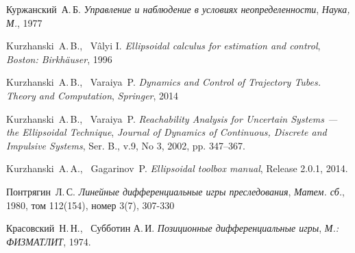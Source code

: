 \begin{thebibliography}{0}

	 Куржанский~А.\,Б. 
	\emph{Управление и наблюдение в условиях неопределенности}, \emph{Наука, М.}, 1977

	 Kurzhanski~A.\,B., \ Vâlyi I.
	\emph{Ellipsoidal calculus for estimation and control}, \emph{Boston: Birkhäuser}, 1996

	 Kurzhanski~A.\,B., \ Varaiya~P. 
	\emph{Dynamics and Control of Trajectory Tubes. Theory and Computation}, \emph{Springer}, 2014

	 Kurzhanski~A.\,B., \ Varaiya~P. 
	\emph{Reachability Analysis for Uncertain Systems — the Ellipsoidal Technique}, \emph{Journal of Dynamics of Continuous, Discrete and Impulsive Systems}, Ser. B., v.9, No 3, 2002, pp. 347–367.

	 Kurzhanski~A.\,A., \ Gagarinov~P. 
	\emph{Ellipsoidal toolbox manual}, Release 2.0.1, 2014.

	 Понтрягин~Л.\,С.
	\emph{Линейные дифференциальные игры преследования}, \emph{Матем. сб.}, 1980, том 112(154), номер 3(7), 307-330

	 Красовский~Н.\,Н., \ Субботин А.\,И.
	\emph{Позиционные дифференциальные игры}, \emph{М.: ФИЗМАТЛИТ}, 1974.

\end{thebibliography}